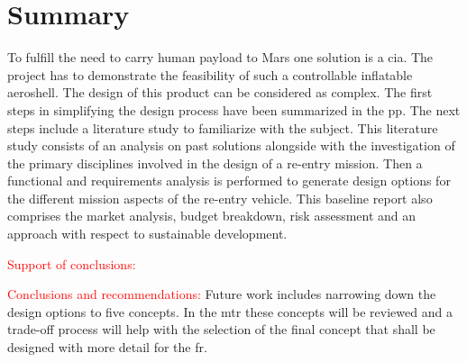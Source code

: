 \section*{Summary}\label{cha:summary}

To fulfill the need to carry human payload to Mars one solution is a \acrfull{cia}. The project has to demonstrate the feasibility of such a controllable inflatable aeroshell. The design of this product can be considered as complex. The first steps in simplifying the design process have been summarized in the \acrfull{pp}. The next steps include a literature study to familiarize with the subject. This literature study consists of an analysis on past solutions alongside with the investigation of the primary disciplines involved in the design of a re-entry mission. Then a functional and requirements analysis is performed to generate design options for the different mission aspects of the re-entry vehicle. This baseline report also comprises the market analysis, budget breakdown, risk assessment and an approach with respect to sustainable development. 

\textcolor{red}{Support of conclusions:}

\textcolor{red}{Conclusions and recommendations:}
Future work includes narrowing down the design options to five concepts. In the \acrfull{mtr} these concepts will be reviewed and a trade-off process will help with the selection of the final concept that shall be designed with more detail for the \acrfull{fr}.
